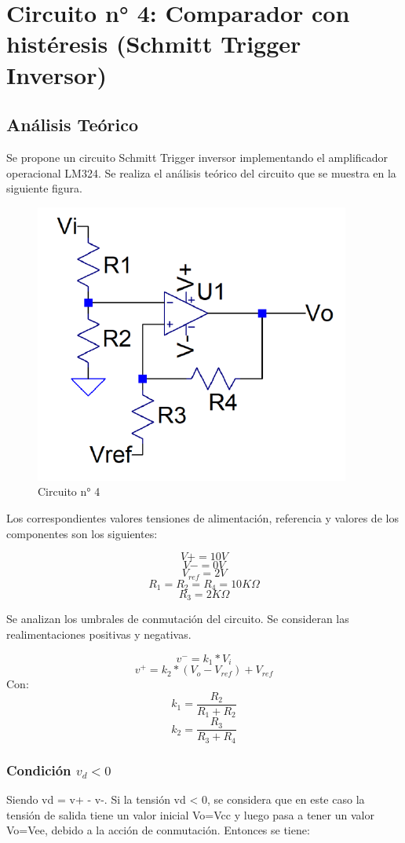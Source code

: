 \section{Circuito n° 4: Comparador con histéresis (Schmitt Trigger Inversor)}



\subsection{Análisis Teórico}

Se propone un circuito Schmitt Trigger inversor implementando el amplificador operacional LM324. Se realiza el análisis teórico del circuito que se muestra en la siguiente figura. 


\begin{figure}[h!]
    \centering
    \includegraphics[width=0.50\linewidth]{Secciones/Circuito4/Circuito 4.png}
    \caption{Circuito n° 4}
    \label{fig:Circuito4}
\end{figure}

Los correspondientes valores tensiones de alimentación, referencia y valores de los componentes son los siguientes:

\[V+ = 10V\]
\[V- = 0V\]
\[V_{ref} = 2V\]
\[R_1 = R_2 = R_4 = 10K\Omega\]
\[R_3 = 2K\Omega\]

Se analizan los umbrales de conmutación del circuito. Se consideran las realimentaciones positivas y negativas.

\[v^- = k_1 * V_i\]
\[v^+ = k_2 * (V_o - V_{ref}) + V_{ref}\]
Con:
\[k_1 = \frac{R_2}{R_1 + R_2}\]
\[ k_2 = \frac{R_3}{R_3 + R_4}\]
\subsubsection{Condición \texorpdfstring{$v_d < 0$}{vd < 0}}
Siendo vd = v+ - v-. Si la tensión vd < 0, se considera que en este caso la tensión de salida tiene un valor inicial Vo=Vcc y luego pasa a tener un valor Vo=Vee, debido a la acción de conmutación.  Entonces se tiene:

